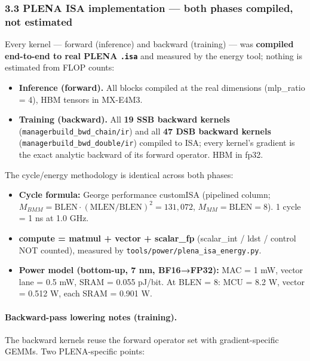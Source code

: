 \documentclass[
  10pt,
]{article}
\providecommand{\tightlist}{%
  \setlength{\itemsep}{0pt}\setlength{\parskip}{0pt}}
\begin{document}
\subsubsection{3.3 PLENA ISA implementation --- both phases compiled, not
estimated}\label{isa-implementation-both-phases}

Every kernel --- forward (inference) and backward (training) --- was
\textbf{compiled end-to-end to real PLENA \texttt{.isa}} and measured by
the energy tool; nothing is estimated from FLOP counts:

\begin{itemize}
\tightlist
\item
  \textbf{Inference (forward).} All blocks compiled at the real
  dimensions (mlp\_ratio = 4), HBM tensors in MX-E4M3.
\item
  \textbf{Training (backward).} All \textbf{19 SSB backward kernels}
  (\texttt{managerbuild\_bwd\_chain/ir}) and all \textbf{47 DSB backward
  kernels} (\texttt{managerbuild\_bwd\_double/ir}) compiled to ISA; every
  kernel's gradient is the exact analytic backward of its forward
  operator. HBM in fp32.
\end{itemize}

The cycle/energy methodology is identical across both phases:

\begin{itemize}
\tightlist
\item
  \textbf{Cycle formula:} George performance customISA (pipelined column;
  \(M_{BMM} = \text{BLEN}\cdot(\text{MLEN}/\text{BLEN})^2 = 131{,}072\),
  \(M_{MM} = \text{BLEN} = 8\)). 1 cycle = 1 ns at 1.0 GHz.
\item
  \textbf{compute = matmul + vector + scalar\_fp} (scalar\_int / ldst /
  control NOT counted), measured by
  \texttt{tools/power/plena\_isa\_energy.py}.
\item
  \textbf{Power model (bottom-up, 7 nm, BF16→FP32):} MAC = 1 mW, vector
  lane = 0.5 mW, SRAM = 0.055 pJ/bit. At BLEN = 8: MCU = 8.2 W, vector =
  0.512 W, each SRAM = 0.901 W.
\end{itemize}

\paragraph{Backward-pass lowering notes (training).}\label{bwd-lowering}

The backward kernels reuse the forward operator set with
gradient-specific GEMMs. Two PLENA-specific points:
\end{document}
